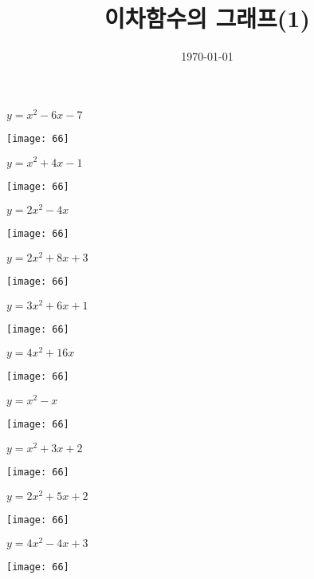 \documentclass[a4paper]{oblivoir}
\title{이차함수의 그래프(1)}
\date{\today}
\author{}
\begin{document}
\maketitle

\begin{minipage}{0.45\textwidth}\centering
\(y=x^2-6x-7\)
\par\bigskip\texttt{[image: 66]}
\end{minipage}
\begin{minipage}{0.45\textwidth}\centering
\(y=x^2+4x-1\)
\par\bigskip\texttt{[image: 66]}
\end{minipage}\bigskip\bigskip\par
\begin{minipage}{0.45\textwidth}\centering
\(y=2x^2-4x\)
\par\bigskip\texttt{[image: 66]}
\end{minipage}
\begin{minipage}{0.45\textwidth}\centering
\(y=2x^2+8x+3\)
\par\bigskip\texttt{[image: 66]}
\end{minipage}\bigskip\bigskip\par

\clearpage
\begin{minipage}{0.45\textwidth}\centering
\(y=3x^2+6x+1\)
\par\bigskip\texttt{[image: 66]}
\end{minipage}
\begin{minipage}{0.45\textwidth}\centering
\(y=4x^2+16x\)
\par\bigskip\texttt{[image: 66]}
\end{minipage}\bigskip\bigskip\par
\begin{minipage}{0.45\textwidth}\centering
\(y=x^2-x\)
\par\bigskip\texttt{[image: 66]}
\end{minipage}
\begin{minipage}{0.45\textwidth}\centering
\(y=x^2+3x+2\)
\par\bigskip\texttt{[image: 66]}
\end{minipage}\bigskip\bigskip\par
\begin{minipage}{0.45\textwidth}\centering
\(y=2x^2+5x+2\)
\par\bigskip\texttt{[image: 66]}
\end{minipage}
\begin{minipage}{0.45\textwidth}\centering
\(y=4x^2-4x+3\)
\par\bigskip\texttt{[image: 66]}
\end{minipage}\bigskip\bigskip\par
\end{document}

